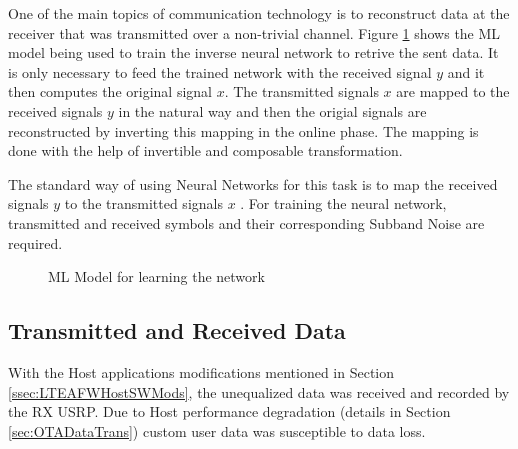 One of the main topics of communication technology is to reconstruct data at the
receiver that was transmitted over a non-trivial channel. Figure \ref{fig:MLModel} shows the ML model being used to train the inverse neural network to retrive the sent data. It is only necessary to feed the trained network with the received signal $y$ and it then computes the original signal $x$. The transmitted signals $x$ are mapped to the received signals $y$ in the natural way and then the origial signals are reconstructed by inverting this mapping in the online phase. The mapping is done with the help of invertible and composable transformation.

The standard way of using Neural Networks for this task is to map the received signals $y$ to the transmitted signals $x$ \cite{JMMLINN}. For training the neural network, transmitted and received symbols and their corresponding Subband Noise are required.

\begin{center}
    \begin{figure}[H]
    \caption{ML Model for learning the network}
    \label{fig:MLModel}
    \end{figure}
\end{center}

\subsection{Transmitted and Received Data}\label{ssec:XYPairs}

With the Host applications modifications mentioned in Section \ref{ssec:LTEAFWHostSWMods}, the unequalized data was received and recorded by the RX USRP. Due to Host performance degradation (details in Section \ref{sec:OTADataTrans}) custom user data was susceptible to data loss.

